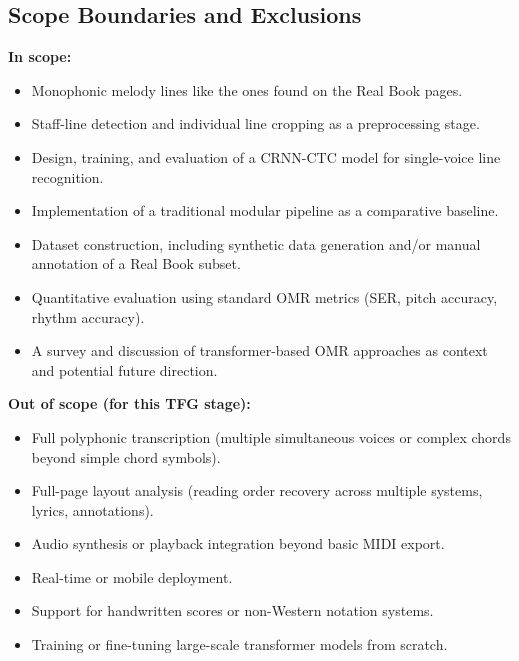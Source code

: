 \documentclass[11pt, a4paper]{article}
\begin{document}
\subsection{Scope Boundaries and Exclusions}
\textbf{In scope:}
\begin{itemize}
    \item Monophonic melody lines like the ones found on the Real Book pages.
    \item Staff-line detection and individual line cropping as a preprocessing stage.
    \item Design, training, and evaluation of a CRNN-CTC model for single-voice line recognition.
    \item Implementation of a traditional modular pipeline as a comparative baseline.
    \item Dataset construction, including synthetic data generation and/or manual annotation of a Real Book subset.
    \item Quantitative evaluation using standard OMR metrics (SER, pitch accuracy, rhythm accuracy).
    \item A survey and discussion of transformer-based OMR approaches as context and potential future direction.
\end{itemize}
\textbf{Out of scope (for this TFG stage):}
\begin{itemize}
    \item Full polyphonic transcription (multiple simultaneous voices or complex chords beyond simple chord symbols).
    \item Full-page layout analysis (reading order recovery across multiple systems, lyrics, annotations).
    \item Audio synthesis or playback integration beyond basic MIDI export.
    \item Real-time or mobile deployment.
    \item Support for handwritten scores or non-Western notation systems.
    \item Training or fine-tuning large-scale transformer models from scratch.
\end{itemize}
\end{document}

